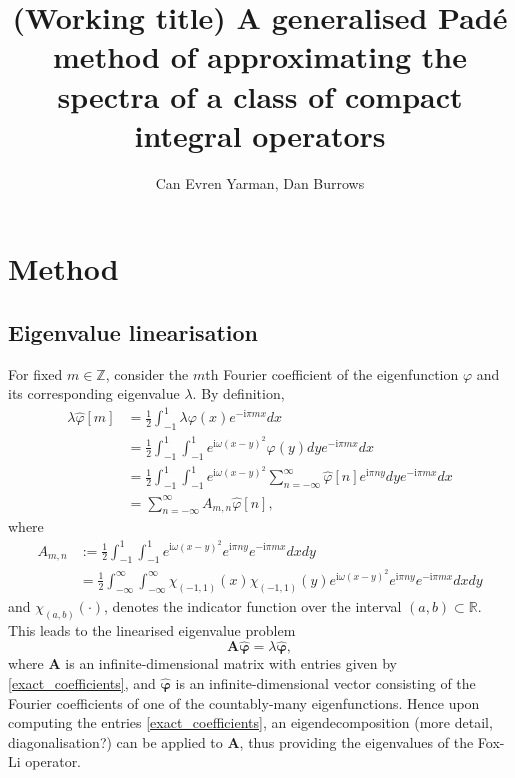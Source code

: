 \documentclass[11pt, a4paper]{article}
\title{(Working title) A generalised Pad\'e method of approximating the spectra of a class of compact integral operators}
\author{Can Evren Yarman, Dan Burrows}
\newcommand{\be}{\begin{equation}}
\newcommand{\ee}{\end{equation}}
\newcommand{\R}{\mathbb{R}}
\newcommand{\Z}{\mathbb{Z}}
\newcommand{\im}{\text{i}}
\newcommand{\infint}{\int_{-\infty}^\infty}
\numberwithin{equation}{section}
\begin{document}
\maketitle
\section{Method}
\subsection{Eigenvalue linearisation}
For fixed $m\in\Z$, consider the $m$th Fourier coefficient of the eigenfunction $\varphi$ and its corresponding eigenvalue $\lambda$. By definition,
\begin{align*}
\lambda\hat{\varphi}[m] &= \frac{1}{2}\int_{-1}^1 \lambda\varphi(x)e^{-\im\pi m x}dx
\\
&= \frac{1}{2}\int_{-1}^1\int_{-1}^1e^{\im\omega(x - y)^2}\varphi(y)dye^{-\im\pi m x}dx
\\
&= \frac{1}{2}\int_{-1}^1\int_{-1}^1e^{\im\omega(x - y)^2}\sum_{n = -\infty}^\infty\hat{\varphi}[n]e^{\im \pi n y}dye^{-\im\pi m x}dx
\\
& = \sum_{n = -\infty}^\infty A_{m, n}\hat{\varphi}[n],
\end{align*}
where
\begin{align}
A_{m, n} &:= \frac{1}{2}\int_{-1}^1\int_{-1}^1e^{\im\omega(x - y)^2}e^{\im \pi n y}e^{-\im\pi m x}dxdy\nonumber
\\
&=\frac{1}{2}\infint\infint \chi_{(-1, 1)}(x)\chi_{(-1, 1)}(y)e^{\im\omega(x - y)^2}e^{\im \pi n y}e^{-\im\pi m x}dxdy\label{exact_coefficients}
\end{align}
and $\chi_{(a, b)}(\cdot)$, denotes the indicator function over the interval $(a, b)\subset\R$. This leads to the linearised eigenvalue problem 
\be\label{exact_eigenvalue}
\bm{A}\hat{\bm{\varphi}} = \lambda\hat{\bm{\varphi}},
\ee
where $\bm{A}$ is an infinite-dimensional matrix with entries given by \eqref{exact_coefficients}, and $\hat{\bm{\varphi}}$ is an infinite-dimensional vector consisting of the Fourier coefficients of one of the countably-many eigenfunctions. Hence upon computing the entries \eqref{exact_coefficients}, an eigendecomposition (more detail, diagonalisation?) can be applied to $\bm{A}$, thus providing the eigenvalues of the Fox-Li operator.
\end{document}
